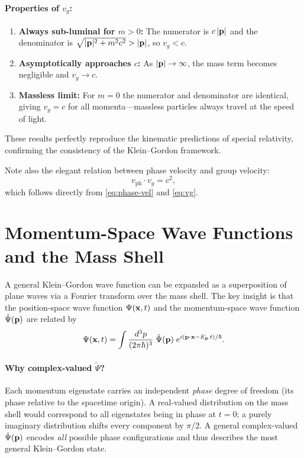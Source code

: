 \documentclass[12pt, a4paper]{article}
\theoremstyle{definition}
\begin{document}
\paragraph{Properties of $v_{g}$:}
\begin{enumerate}[label=(\roman*)]
    \item \textbf{Always sub-luminal for $m>0$:}\;
          The numerator is $c\,|\vb{p}|$ and the denominator is
          $\sqrt{|\vb{p}|^{2}+m^{2}c^{2}} > |\vb{p}|$, so $v_{g}<c$.
    \item \textbf{Asymptotically approaches $c$:}\;
          As $|\vb{p}|\to\infty$, the mass term becomes negligible and
          $v_{g}\to c$.
    \item \textbf{Massless limit:}\;
          For $m=0$ the numerator and denominator are identical, giving
          $v_{g}=c$ for all momenta---massless particles always travel at
          the speed of light.
\end{enumerate}

These results perfectly reproduce the kinematic predictions of special
relativity, confirming the consistency of the Klein--Gordon framework.

Note also the elegant relation between phase velocity and group velocity:
\begin{equation}
    v_{\text{ph}}\cdot v_{g} = c^{2},
\end{equation}
which follows directly from \eqref{eq:phase-vel} and \eqref{eq:vg}.

\section{Momentum-Space Wave Functions and the Mass Shell}
\label{sec:momentum-space}

A general Klein--Gordon wave function can be expanded as a superposition of
plane waves via a Fourier transform over the mass shell.  The key insight is
that the position-space wave function $\Psi(\vb{x},t)$ and the
momentum-space wave function $\tilde{\Psi}(\vb{p})$ are related by
\begin{equation}
    \Psi(\vb{x},t)
    = \int \frac{d^{3}p}{(2\pi\hbar)^{3}}\;
      \tilde{\Psi}(\vb{p})\;
      e^{i(\vb{p}\cdot\vb{x} - E_{\vb{p}}\,t)/\hbar}.
\end{equation}

\paragraph{Why complex-valued $\tilde\Psi$?}
Each momentum eigenstate carries an independent \emph{phase} degree of
freedom (its phase relative to the spacetime origin).  A real-valued
distribution on the mass shell would correspond to all eigenstates being in
phase at $t=0$; a purely imaginary distribution shifts every component by
$\pi/2$.  A general complex-valued $\tilde\Psi(\vb{p})$ encodes \emph{all}
possible phase configurations and thus describes the most general
Klein--Gordon state.
\end{document}
